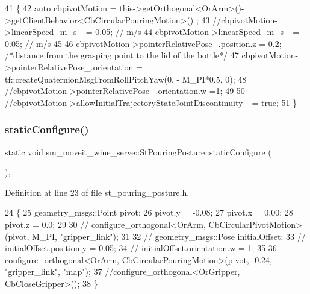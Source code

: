 \begin{DoxyCode}
41         \{
42             \textcolor{keyword}{auto} cbpivotMotion = this->getOrthogonal<OrArm>()->getClientBehavior<CbCircularPouringMotion>()
      ;
43             \textcolor{comment}{//cbpivotMotion->linearSpeed\_m\_s\_ = 0.05; // m/s}
44             cbpivotMotion->linearSpeed\_m\_s\_ = 0.05; \textcolor{comment}{// m/s}
45 
46             cbpivotMotion->pointerRelativePose\_.position.z = 0.2; \textcolor{comment}{/*distance from the grasping point to the
       lid of the bottle*/}
47             cbpivotMotion->pointerRelativePose\_.orientation = tf::createQuaternionMsgFromRollPitchYaw(0, -
      M\_PI*0.5, 0);
48             \textcolor{comment}{//cbpivotMotion->pointerRelativePose\_.orientation.w =1;}
49 
50             \textcolor{comment}{//cbpivotMotion->allowInitialTrajectoryStateJointDiscontinuity\_ = true;}
51         \}
\end{DoxyCode}
\mbox{\label{structsm__moveit__wine__serve_1_1StPouringPosture_a3d8119738084a61e5f7d50f4a6ae706c}} 
\subsubsection{\texorpdfstring{static\+Configure()}{staticConfigure()}}
{\footnotesize\ttfamily static void sm\+\_\+moveit\+\_\+wine\+\_\+serve\+::\+St\+Pouring\+Posture\+::static\+Configure (\begin{DoxyParamCaption}{ }\end{DoxyParamCaption})\hspace{0.3cm}{\ttfamily [inline]}, {\ttfamily [static]}}



Definition at line 23 of file st\+\_\+pouring\+\_\+posture.\+h.


\begin{DoxyCode}
24         \{
25             geometry\_msgs::Point pivot;
26             pivot.y = -0.08;
27             pivot.x = 0.00;
28             pivot.z = 0.0;
29 
30             \textcolor{comment}{// configure\_orthogonal<OrArm, CbCircularPivotMotion>(pivot, M\_PI, "gripper\_link");}
31 
32             \textcolor{comment}{// geometry\_msgs::Pose initialOffset;}
33             \textcolor{comment}{// initialOffset.position.y = 0.05;}
34             \textcolor{comment}{// initialOffset.orientation.w = 1;}
35 
36             configure\_orthogonal<OrArm, CbCircularPouringMotion>(pivot, -0.24, \textcolor{stringliteral}{"gripper\_link"}, \textcolor{stringliteral}{"map"});
37             \textcolor{comment}{//configure\_orthogonal<OrGripper, CbCloseGripper>();}
38         \}
\end{DoxyCode}


